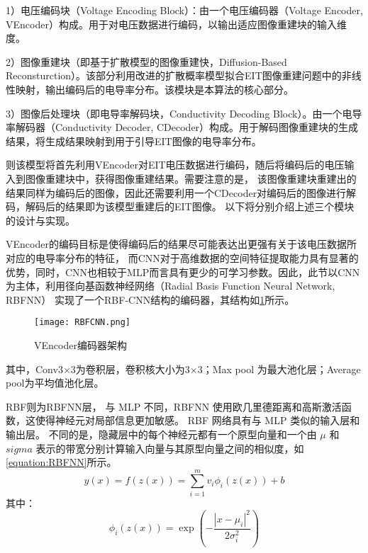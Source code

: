 1）电压编码块（Voltage Encoding Block）：由一个电压编码器（Voltage Encoder, VEncoder）构成。用于对电压数据进行编码，以输出适应图像重建块的输入维度。

2）图像重建块（即基于扩散模型的图像重建快，Diffusion-Based Reconsturction）。该部分利用改进的扩散概率模型拟合EIT图像重建问题中的非线性映射，输出编码后的电导率分布。该模块是本算法的核心部分。

3）图像后处理块（即电导率解码块，Conductivity Decoding Block）。由一个电导率解码器（Conductivity Decoder, CDecoder）构成。用于解码图像重建块的生成结果，将生成结果映射到用于引导EIT图像的电导率分布。

则该模型将首先利用VEncoder对EIT电压数据进行编码，随后将编码后的电压输入到图像重建块中，获得图像重建结果。需要注意的是，
该图像重建块重建出的结果同样为编码后的图像，因此还需要利用一个CDecoder对编码后的图像进行解码，解码后的结果即为该模型重建后的EIT图像。
以下将分别介绍上述三个模块的设计与实现。





VEncoder的编码目标是使得编码后的结果尽可能表达出更强有关于该电压数据所对应的电导率分布的特征，
而CNN对于高维数据的空间特征提取能力具有显著的优势，同时，CNN也相较于MLP而言具有更少的可学习参数。因此，此节以CNN为主体，利用径向基函数神经网络（Radial Basis Function Neural Network, RBFNN）
实现了一个RBF-CNN结构的编码器，其结构如\cref{figure:RBFCNN}所示。
\begin{figure}[h]
    \centering
    \texttt{[image: RBFCNN.png]}
    \caption{VEncoder编码器架构}
    \label{figure:RBFCNN}
\end{figure}

其中，Conv3$\times$3为卷积层，卷积核大小为3$\times$3；Max pool 为最大池化层；Average pool为平均值池化层。

RBF则为RBFNN层，
与 MLP 不同，RBFNN 使用欧几里德距离和高斯激活函数，这使得神经元对局部信息更加敏感。 
RBF 网络具有与 MLP 类似的输入层和输出层。
不同的是，隐藏层中的每个神经元都有一个原型向量和一个由 $\mu$ 和 $sigma$ 表示的带宽分别计算输入向量与其原型向量之间的相似度，如\cref{equation:RBFNN}所示。
\begin{equation}
    \label{equation:RBFNN}
    y(x) = f(z(x)) = \sum_{i=1}^{m} v_i \phi_i(z(x)) + b
\end{equation}
其中：
\begin{equation}
    \phi_i(z(x)) = \exp\left(-\frac{|x - \mu_i|^2}{2\sigma_i^2}\right)
\end{equation}


